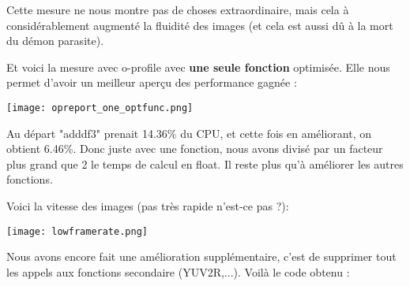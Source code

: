 Cette mesure ne nous montre pas de choses extraordinaire, mais cela à considérablement augmenté la fluidité des images (et cela est aussi dû à la mort du démon parasite).

\pagebreak Et voici la mesure avec o-profile avec \textbf{une seule fonction} optimisée. Elle nous permet d'avoir un meilleur aperçu des performance gagnée :

\begin{center} 
\hspace{12.45cm}
\texttt{[image: opreport\_one\_optfunc.png]}
\end{center}
\vspace{0.5cm}

Au départ "adddf3" prenait 14.36\% du CPU, et cette fois en améliorant, on obtient 6.46\%. Donc juste avec une fonction, nous avons divisé par un facteur plus grand que 2 le temps de calcul en float. Il reste plus qu'à améliorer les autres fonctions.

Voici la vitesse des images (pas très rapide n'est-ce pas ?):

\begin{center} 
\hspace{12.45cm}
\texttt{[image: lowframerate.png]}
\end{center}
\vspace{0.5cm}



\pagebreak Nous avons encore fait une amélioration supplémentaire, c'est de supprimer tout les appels aux fonctions secondaire (YUV2R,...). Voilà le code obtenu :

